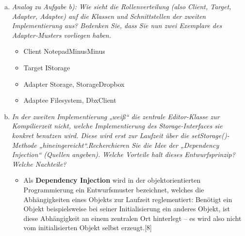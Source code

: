 \begin{enumerate}[(a)]
   
    \item {\itshape Analog zu Aufgabe b): Wie sieht die Rollenverteilung (also Client, Target, Adapter, Adaptee) auf die Klassen und Schnittstellen der zweiten Implementierung aus? Bedenken Sie, dass Sie nun zwei Exemplare des Adapter-Musters vorliegen haben.}
    \begin{itemize}
        \item Client \rightarrow NotepadMinusMinus
        \item Target \rightarrow IStorage
        \item Adapter \rightarrow Storage, StorageDropbox
        \item Adaptee \rightarrow Filesystem, DbxClient
    \end{itemize}
    
    \item {\itshape In der zweiten Implementierung „weiß“ die zentrale Editor-Klasse zur Kompilierzeit nicht, welche Implementierung des Storage-Interfaces sie konkret benutzen wird. Diese wird erst zur Laufzeit über die setStorage()-Methode „hineingereicht“.Recherchieren Sie die Idee der „Dependency Injection“ (Quellen angeben). Welche Vorteile halt dieses Entwurfsprinzip? Welche Nachteile?}
    \begin{itemize}
        \item Als \textbf{Dependency Injection} wird in der objektorientierten Programmierung ein Entwurfsmuster bezeichnet, welches die Abhängigkeiten eines Objekts zur Laufzeit reglementiert: Benötigt ein Objekt beispielsweise bei seiner Initialisierung ein anderes Objekt, ist diese Abhängigkeit an einem zentralen Ort hinterlegt – es wird also nicht vom initialisierten Objekt selbst erzeugt.[8]


\end{itemize}
\end{enumerate}
